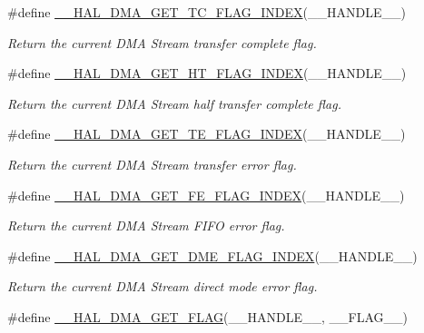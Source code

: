 \begin{DoxyCompactItemize}
\#define \mbox{\hyperlink{group___d_m_a_gae3feef5ea50ff13a6a5b98cb353c87b0}{\+\_\+\+\_\+\+H\+A\+L\+\_\+\+D\+M\+A\+\_\+\+G\+E\+T\+\_\+\+T\+C\+\_\+\+F\+L\+A\+G\+\_\+\+I\+N\+D\+EX}}(\+\_\+\+\_\+\+H\+A\+N\+D\+L\+E\+\_\+\+\_\+)
\begin{DoxyCompactList}\small\item\em Return the current D\+MA Stream transfer complete flag. \end{DoxyCompactList}\item 
\#define \mbox{\hyperlink{group___d_m_a_ga0095f5f3166a82bedc67744ac94acfba}{\+\_\+\+\_\+\+H\+A\+L\+\_\+\+D\+M\+A\+\_\+\+G\+E\+T\+\_\+\+H\+T\+\_\+\+F\+L\+A\+G\+\_\+\+I\+N\+D\+EX}}(\+\_\+\+\_\+\+H\+A\+N\+D\+L\+E\+\_\+\+\_\+)
\begin{DoxyCompactList}\small\item\em Return the current D\+MA Stream half transfer complete flag. \end{DoxyCompactList}\item 
\#define \mbox{\hyperlink{group___d_m_a_ga5e765bb3b1c5fc9f1b1abbbb764250bc}{\+\_\+\+\_\+\+H\+A\+L\+\_\+\+D\+M\+A\+\_\+\+G\+E\+T\+\_\+\+T\+E\+\_\+\+F\+L\+A\+G\+\_\+\+I\+N\+D\+EX}}(\+\_\+\+\_\+\+H\+A\+N\+D\+L\+E\+\_\+\+\_\+)
\begin{DoxyCompactList}\small\item\em Return the current D\+MA Stream transfer error flag. \end{DoxyCompactList}\item 
\#define \mbox{\hyperlink{group___d_m_a_ga5878c3a1dbcf01e6840fffcf1f244088}{\+\_\+\+\_\+\+H\+A\+L\+\_\+\+D\+M\+A\+\_\+\+G\+E\+T\+\_\+\+F\+E\+\_\+\+F\+L\+A\+G\+\_\+\+I\+N\+D\+EX}}(\+\_\+\+\_\+\+H\+A\+N\+D\+L\+E\+\_\+\+\_\+)
\begin{DoxyCompactList}\small\item\em Return the current D\+MA Stream F\+I\+FO error flag. \end{DoxyCompactList}\item 
\#define \mbox{\hyperlink{group___d_m_a_ga23d1f282af3b9aa7aa396dcad94865d8}{\+\_\+\+\_\+\+H\+A\+L\+\_\+\+D\+M\+A\+\_\+\+G\+E\+T\+\_\+\+D\+M\+E\+\_\+\+F\+L\+A\+G\+\_\+\+I\+N\+D\+EX}}(\+\_\+\+\_\+\+H\+A\+N\+D\+L\+E\+\_\+\+\_\+)
\begin{DoxyCompactList}\small\item\em Return the current D\+MA Stream direct mode error flag. \end{DoxyCompactList}\item 
\#define \mbox{\hyperlink{group___d_m_a_ga798d4b3b3fbd32b95540967bb35b35be}{\+\_\+\+\_\+\+H\+A\+L\+\_\+\+D\+M\+A\+\_\+\+G\+E\+T\+\_\+\+F\+L\+AG}}(\+\_\+\+\_\+\+H\+A\+N\+D\+L\+E\+\_\+\+\_\+,  \+\_\+\+\_\+\+F\+L\+A\+G\+\_\+\+\_\+)

\end{DoxyCompactItemize}
